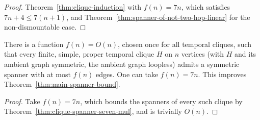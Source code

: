 \begin{proof}
  \leanok
  Theorem~\ref{thm:clique-induction} with $f(n) = 7n$, which satisfies
  $7n + 4 \le 7(n + 1)$, and Theorem~\ref{thm:spanner-of-not-two-hop-linear} for
  the non-dismountable case.
\end{proof}

\begin{theorem}
  \label{thm:linear-main}
  \leanok
  There is a function $f(n) = O(n)$, chosen once for all temporal cliques, such
  that every finite, simple, proper temporal clique $H$ on $n$ vertices (with
  $H$ and its ambient graph symmetric, the ambient graph loopless) admits a
  symmetric spanner with at most $f(n)$ edges. One can take $f(n) = 7n$. This
  improves Theorem~\ref{thm:main-spanner-bound}.
\end{theorem}

\begin{proof}
  \leanok
  Take $f(n) = 7n$, which bounds the spanners of every such clique by
  Theorem~\ref{thm:clique-spanner-seven-mul}, and is trivially $O(n)$.
\end{proof}
